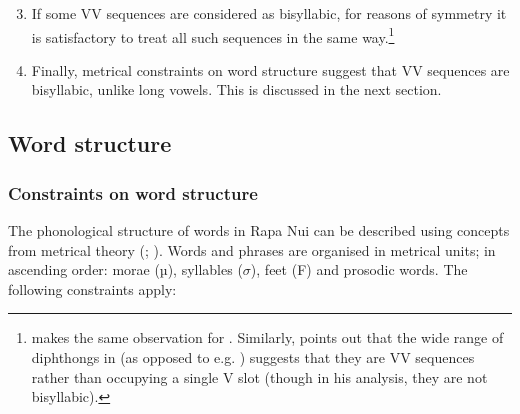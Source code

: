 
\begin{enumerate}

\setcounter{enumi}{2}
\item 
If some VV sequences are considered as bisyllabic, for reasons of symmetry it is satisfactory to treat all such sequences in the same way.\footnote{\label{fn:41}\citet[24]{Berg1989} makes the same observation for . Similarly, \citet[127]{Rehg2007} points out that the wide range of diphthongs in  (as opposed to e.g. ) suggests that they are VV sequences rather than occupying a single V slot (though in his analysis, they are not bisyllabic).}

\item 
Finally, metrical constraints on word structure suggest that VV sequences are bisyllabic, unlike long vowels. This is discussed in the next section.
\end{enumerate}
\subsection{Word structure}\label{sec:2.3.2}
\subsubsection{Constraints on word structure}\label{sec:2.3.2.1}

The phonological structure of words in Rapa Nui can be described using concepts from metrical theory (\citealt{Kager1995}; \citealt{Hayes1995}). Words and phrases are organised in metrical units; in ascending order: morae (µ), syllables ($\sigma $), feet (F) and prosodic words. The following constraints apply:

